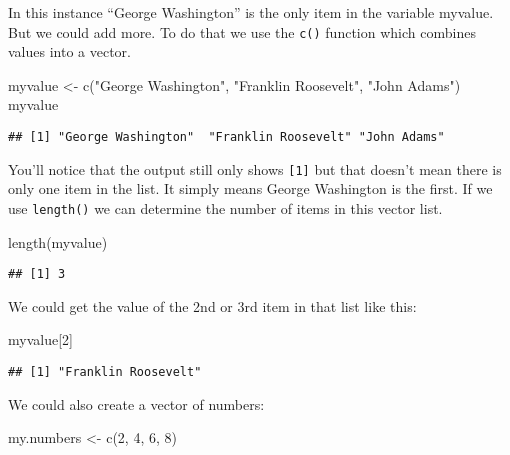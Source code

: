\documentclass[
]{article}
\newenvironment{Shaded}{\begin{snugshade}}{\end{snugshade}}
\newcommand{\DecValTok}[1]{\textcolor[rgb]{0.00,0.00,0.81}{#1}}
\newcommand{\FunctionTok}[1]{\textcolor[rgb]{0.00,0.00,0.00}{#1}}
\newcommand{\NormalTok}[1]{#1}
\newcommand{\OtherTok}[1]{\textcolor[rgb]{0.56,0.35,0.01}{#1}}
\newcommand{\StringTok}[1]{\textcolor[rgb]{0.31,0.60,0.02}{#1}}
\begin{document}
In this instance ``George Washington'' is the only item in the variable
myvalue. But we could add more. To do that we use the \texttt{c()}
function which combines values into a vector.

\begin{Shaded}
\begin{Highlighting}[]
\NormalTok{myvalue }\OtherTok{\textless{}{-}} \FunctionTok{c}\NormalTok{(}\StringTok{"George Washington"}\NormalTok{, }\StringTok{"Franklin Roosevelt"}\NormalTok{, }\StringTok{"John Adams"}\NormalTok{)}
\NormalTok{myvalue}
\end{Highlighting}
\end{Shaded}

\begin{verbatim}
## [1] "George Washington"  "Franklin Roosevelt" "John Adams"
\end{verbatim}

You'll notice that the output still only shows \texttt{{[}1{]}} but that
doesn't mean there is only one item in the list. It simply means George
Washington is the first. If we use \texttt{length()} we can determine
the number of items in this vector list.

\begin{Shaded}
\begin{Highlighting}[]
\FunctionTok{length}\NormalTok{(myvalue)}
\end{Highlighting}
\end{Shaded}

\begin{verbatim}
## [1] 3
\end{verbatim}

We could get the value of the 2nd or 3rd item in that list like this:

\begin{Shaded}
\begin{Highlighting}[]
\NormalTok{myvalue[}\DecValTok{2}\NormalTok{]}
\end{Highlighting}
\end{Shaded}

\begin{verbatim}
## [1] "Franklin Roosevelt"
\end{verbatim}

We could also create a vector of numbers:

\begin{Shaded}
\begin{Highlighting}[]
\NormalTok{my.numbers }\OtherTok{\textless{}{-}} \FunctionTok{c}\NormalTok{(}\DecValTok{2}\NormalTok{, }\DecValTok{4}\NormalTok{, }\DecValTok{6}\NormalTok{, }\DecValTok{8}\NormalTok{)}
\end{Highlighting}
\end{Shaded}
\end{document}
